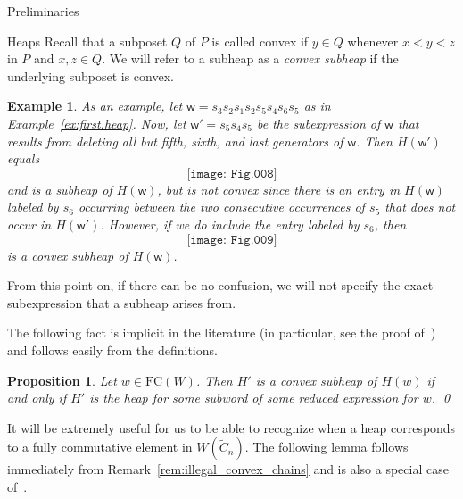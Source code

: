 \documentclass[12pt]{amsart}
\newtheorem{prop}[thm]{Proposition}
\newtheorem{ex}[thm]{Example}
\newcommand{\C}{\widetilde{C}}
\renewcommand{\(}{\left(}
\renewcommand{\)}{\right)}
\newcommand{\w}{\mathsf{w}}
\newcommand{\FC}{\mathrm{FC}}
\begin{document}
\begin{section}{Preliminaries}
\begin{subsection}{Heaps}
Recall that a subposet $Q$ of $P$ is called convex if $y \in Q$ whenever $x < y < z$ in $P$ and $x, z \in Q$.  We will refer to a subheap as a \emph{convex subheap} if the underlying subposet is convex.  

\begin{ex}
As an example, let $\w= s_3 s_2 s_1 s_2 s_5s_{4}s_{6}s_{5}$ as in Example~\ref{ex:first.heap}.  Now, let $\w'=s_{5}s_{4}s_{5}$ be the subexpression of $\w$ that results from deleting all but fifth, sixth, and last generators of $\w$.  Then $H(\w')$ equals 
\[
\texttt{[image: Fig.008]}
\]
and is a subheap of $H(\w)$, but is not convex since there is an entry in $H(\w)$ labeled by $s_{6}$ occurring between the two consecutive occurrences of $s_{5}$ that does not occur in $H(\w')$.  However, if we do include the entry labeled by $s_{6}$, then
\[
\texttt{[image: Fig.009]}
\]
is a convex subheap of $H(\w)$.
\end{ex}

From this point on, if there can be no confusion, we will not specify the exact subexpression that a subheap arises from.

The following fact is implicit in the literature (in particular, see the proof of~\cite[Proposition 3.3]{Stembridge.J:B}) and follows easily from the definitions.

\begin{prop}
Let $w \in \FC(W)$.  Then $H'$ is a convex subheap of $H(w)$ if and only if $H'$ is the heap for some subword of some reduced expression for $w$.   \qed
\end{prop}

It will be extremely useful for us to be able to recognize when a heap corresponds to a fully commutative element in $W(\C_{n})$.  The following lemma follows immediately from Remark~\ref{rem:illegal_convex_chains} and is also a special case of~\cite[Proposition 3.3]{Stembridge.J:B}.


\end{subsection}
\end{section}
\end{document}
